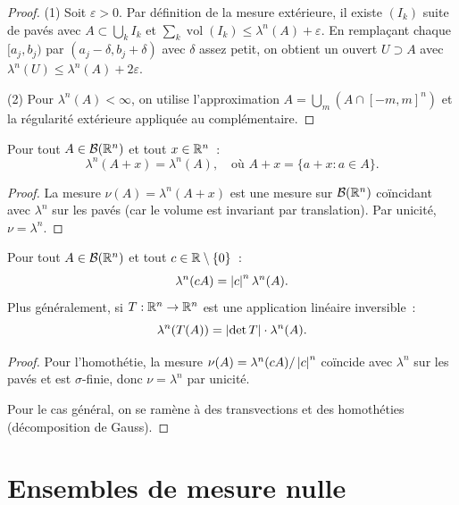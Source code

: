 \begin{proof}
(1) Soit $\varepsilon > 0$. Par d\'efinition de la mesure ext\'erieure, il existe
$(I_k)$ suite de pav\'es avec $A \subset \bigcup_k I_k$ et
$\sum_k \operatorname{vol}(I_k) \leq \lambda^n(A) + \varepsilon$. En rempla\c{c}ant
chaque $[a_j, b_j)$ par $(a_j - \delta, b_j + \delta)$ avec $\delta$ assez petit,
on obtient un ouvert $U \supset A$ avec $\lambda^n(U) \leq \lambda^n(A) +
2\varepsilon$.

(2) Pour $\lambda^n(A) < \infty$, on utilise l'approximation
$A = \bigcup_m (A \cap [-m, m]^n)$ et la r\'egularit\'e ext\'erieure appliqu\'ee au
compl\'ementaire.
\end{proof}

\begin{theoreme}
\label{thm:invariance_translation}
Pour tout $A \in \mathcal{B}(\mathbb{R}^n)$ et tout $x \in \mathbb{R}^n$~:
\[
\lambda^n(A + x) = \lambda^n(A), \quad \text{o\`u } A + x = \{a + x : a \in A\}.
\]
\end{theoreme}

\begin{proof}
La mesure $\nu(A) = \lambda^n(A + x)$ est une mesure sur $\mathcal{B}(\mathbb{R}^n)$
co\"incidant avec $\lambda^n$ sur les pav\'es (car le volume est invariant par
translation). Par unicit\'e, $\nu = \lambda^n$.
\end{proof}

\begin{theoreme}
Pour tout $A \in \mathcal{B}(\mathbb{R}^n)$ et tout $c \in \mathbb{R} \setminus \{0\}$~:
\[
\lambda^n(cA) = \left| c \right|^n \lambda^n(A).
\]
Plus g\'en\'eralement, si $T : \mathbb{R}^n \to \mathbb{R}^n$ est une application lin\'eaire
inversible~:
\[
\lambda^n(T(A)) = \left| \det T \right| \cdot \lambda^n(A).
\]
\end{theoreme}

\begin{proof}
Pour l'homoth\'etie, la mesure $\nu(A) = \lambda^n(cA)/\left| c \right|^n$ co\"incide avec
$\lambda^n$ sur les pav\'es et est $\sigma$-finie, donc $\nu = \lambda^n$ par unicit\'e.

Pour le cas g\'en\'eral, on se ram\`ene \`a des transvections et des homoth\'eties
(d\'ecomposition de Gauss).
\end{proof}

\section{Ensembles de mesure nulle}

